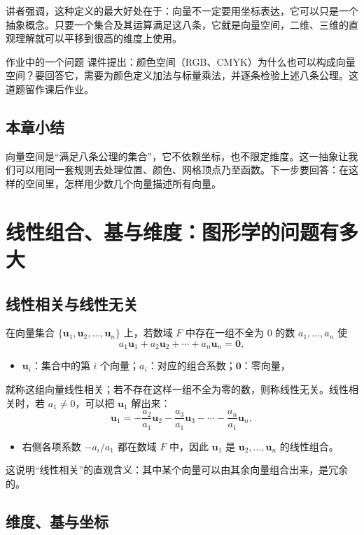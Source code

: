 \documentclass[a4paper]{article}
\begin{document}
讲者强调，这种定义的最大好处在于：向量不一定要用坐标表达，它可以只是一个抽象概念。只要一个集合及其运算满足这八条，它就是向量空间，二维、三维的直观理解就可以平移到很高的维度上使用。

\begin{knowledgebox}{作业中的一个问题}
课件提出：颜色空间（RGB、CMYK）为什么也可以构成向量空间？要回答它，需要为颜色定义加法与标量乘法，并逐条检验上述八条公理。这道题留作课后作业。
\end{knowledgebox}

\subsection{本章小结}

向量空间是“满足八条公理的集合”，它不依赖坐标，也不限定维度。这一抽象让我们可以用同一套规则去处理位置、颜色、网格顶点乃至函数。下一步要回答：在这样的空间里，怎样用少数几个向量描述所有向量。

\section{线性组合、基与维度：图形学的问题有多大}

\subsection{线性相关与线性无关}

在向量集合 $\{\boldsymbol u_1,\boldsymbol u_2,\dots,\boldsymbol u_n\}$ 上，若数域 $F$ 中存在一组不全为 $0$ 的数 $a_1,\dots,a_n$ 使
\[
a_1\boldsymbol u_1+a_2\boldsymbol u_2+\cdots+a_n\boldsymbol u_n=\boldsymbol 0,
\]
\begin{itemize}
\item $\boldsymbol u_i$：集合中的第 $i$ 个向量；$a_i$：对应的组合系数；$\boldsymbol 0$：零向量，
\end{itemize}
就称这组向量线性相关；若不存在这样一组不全为零的数，则称线性无关。线性相关时，若 $a_1\neq 0$，可以把 $\boldsymbol u_1$ 解出来：
\[
\boldsymbol u_1=-\frac{a_2}{a_1}\boldsymbol u_2-\frac{a_3}{a_1}\boldsymbol u_3-\cdots-\frac{a_n}{a_1}\boldsymbol u_n ,
\]
\begin{itemize}
\item 右侧各项系数 $-a_i/a_1$ 都在数域 $F$ 中，因此 $\boldsymbol u_1$ 是 $\boldsymbol u_2,\dots,\boldsymbol u_n$ 的线性组合。
\end{itemize}
这说明“线性相关”的直观含义：其中某个向量可以由其余向量组合出来，是冗余的。

\subsection{维度、基与坐标}
\end{document}
